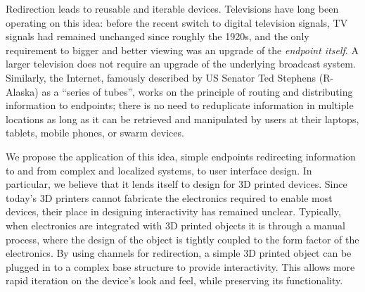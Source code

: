 Redirection leads to reusable and iterable devices.  Televisions have long been operating on this idea: before the recent switch to digital television signals, TV signals had remained unchanged since roughly the 1920s, and the only requirement to bigger and better viewing was an upgrade of the \emph{endpoint itself}.  A larger television does not require an upgrade of the underlying broadcast system.  Similarly, the Internet, famously described by US Senator Ted Stephens (R-Alaska) as a ``series of tubes'', works on the principle of routing and distributing information to endpoints; there is no need to reduplicate information in multiple locations as long as it can be retrieved and manipulated by users at their laptops, tablets, mobile phones, or swarm devices. 

We propose the application of this idea, simple endpoints redirecting information to and from complex and localized systems, to user interface design.  In particular, we believe that it lends itself to design for 3D printed devices.  Since today's 3D printers cannot fabricate the electronics required to enable most devices, their place in designing interactivity has remained unclear.  Typically, when electronics are integrated with 3D printed objects it is through a manual process, where the design of the object is tightly coupled to the form factor of the electronics.  By using channels for redirection, a simple 3D printed object can be plugged in to a complex base structure to provide interactivity.  This allows more rapid iteration on the device's look and feel, while preserving its functionality.  

